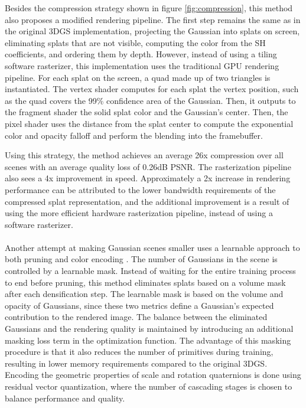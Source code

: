 Besides the compression strategy shown in figure \ref{fig:compression}, this method also proposes a modified rendering pipeline. The first step remains the same as in the original 3DGS implementation, projecting the Gaussian into splats on screen, eliminating splats that are not visible, computing the color from the SH coefficients, and ordering them by depth. However, instead of using a tiling software rasterizer, this implementation uses the traditional GPU rendering pipeline. For each splat on the screen, a quad made up of two triangles is instantiated. The vertex shader computes for each splat the vertex position, such as the quad covers the 99\% confidence area of the Gaussian. Then, it outputs to the fragment shader the solid splat color and the Gaussian's center. Then, the pixel shader uses the distance from the splat center to compute the exponential color and opacity falloff and perform the blending into the framebuffer. 

Using this strategy, the method achieves an average 26x compression over all scenes with an average quality loss of 0.26dB PSNR. The rasterization pipeline also sees a 4x improvement in speed. Approximately a 2x increase in rendering performance can be attributed to the lower bandwidth requirements of the compressed splat representation, and the additional improvement is a result of using the more efficient hardware rasterization pipeline, instead of using a software rasterizer. 

\paragraph{}
Another attempt at making Gaussian scenes smaller uses a learnable approach to both pruning and color encoding \cite{Lee_2024_CVPR}. The number of Gaussians in the scene is controlled by a learnable mask. Instead of waiting for the entire training process to end before pruning, this method eliminates splats based on a volume mask after each densification step. The learnable mask is based on the volume and opacity of Gaussians, since these two metrics define a Gaussian's expected contribution to the rendered image. The balance between the eliminated Gaussians and the rendering quality is maintained by introducing an additional masking loss term in the optimization function. The advantage of this masking procedure is that it also reduces the number of primitives during training, resulting in lower memory requirements compared to the original 3DGS. Encoding the geometric properties of scale and rotation quaternions is done using residual vector quantization, where the number of cascading stages is chosen to balance performance and quality. 

